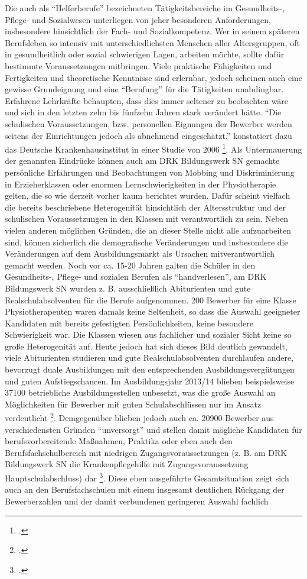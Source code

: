 Die auch als "`Helferberufe"' bezeichneten Tätigkeitsbereiche im Gesundheits-, Pflege- und Sozialwesen unterliegen von jeher besonderen Anforderungen, insbesondere hinsichtlich der Fach- und Sozialkompetenz. Wer in seinem späteren Berufsleben so intensiv mit unterschiedlichsten Menschen aller Altersgruppen, oft in gesundheitlich oder sozial schwierigen Lagen, arbeiten möchte, sollte dafür bestimmte Voraussetzungen mitbringen. Viele praktische Fähigkeiten und Fertigkeiten und theoretische Kenntnisse sind erlernbar, jedoch scheinen auch eine gewisse Grundeignung und eine "`Berufung"' für die Tätigkeiten unabdingbar. Erfahrene Lehrkräfte behaupten, dass dies immer seltener zu beobachten wäre und sich in den letzten zehn bis fünfzehn Jahren stark verändert hätte. "`Die schulischen Voraussetzungen, bzw. personellen Eignungen der Bewerber werden seitens der Einrichtungen jedoch als abnehmend eingeschätzt."' konstatiert dazu das Deutsche Krankenhausinstitut in einer Studie von 2006 \footcite[8]{DeutschesKrankenhausinstitut2006}. Als Untermauerung der genannten Eindrücke können auch am DRK Bildungswerk SN gemachte persönliche Erfahrungen und Beobachtungen von Mobbing und Diskriminierung in Erzieherklassen oder enormen Lernschwierigkeiten in der Physiotherapie gelten, die so wie derzeit vorher kaum berichtet wurden. Dafür scheint vielfach die bereits beschriebene Heterogenität hinsichtlich der Altersstruktur und der schulischen Voraussetzungen in den Klassen mit verantwortlich zu sein. Neben vielen anderen möglichen Gründen, die an dieser Stelle nicht alle aufzuarbeiten sind, können sicherlich die demografische Veränderungen und insbesondere die Veränderungen auf dem Ausbildungsmarkt als Ursachen mitverantwortlich gemacht werden. Noch vor ca. 15-20 Jahren galten die Schüler in den Gesundheits-, Pflege- und sozialen Berufen als "`handverlesen"', am DRK Bildungswerk SN wurden z. B. ausschließlich Abi\-tu\-ri\-en\-ten und gute Realschulabsolventen für die Berufe aufgenommen. 200 Bewerber für eine Klasse Physiotherapeuten waren damals keine Seltenheit, so dass die Auswahl geeigneter Kandidaten mit bereits gefestigten Persönlichkeiten, keine besondere Schwierigkeit war. Die Klassen wiesen aus fachlicher und sozialer Sicht keine so große Heterogenität auf. Heute jedoch hat sich dieses Bild deutlich gewandelt, viele Abiturienten studieren und  gute Realschulabsolventen durchlaufen andere, bevorzugt duale Ausbildungen mit den entsprechenden Ausbildungsvergütungen und guten Aufstiegschancen. Im Ausbildungsjahr 2013/14 blieben beispielsweise 37100 betriebliche Ausbildungsstellen unbesetzt, was die große Auswahl an Möglichkeiten für Bewerber mit guten Schulabschlüssen nur im Ansatz verdeutlicht \footcite[vgl.][15]{BBF2015}. Demgegenüber blieben jedoch auch ca. 20900 Bewerber aus verschiedensten Gründen "`unversorgt"' und stellen damit mögliche Kandidaten für berufsvorbereitende Maßnahmen, Praktika oder eben auch den Berufsfachschulbereich mit niedrigen Zugangsvoraussetzungen (z. B. am DRK Bildungswerk SN die Krankenpflegehilfe mit Zugangsvoraussetzung Hauptschulabschluss) dar \footcite[vgl.][15]{BBF2015}. Diese eben ausgeführte Gesamtsituation zeigt sich auch an den Berufsfachschulen mit einem insgesamt deutlichen Rückgang der Bewerberzahlen und der damit verbundenen geringeren Auswahl fachlich 